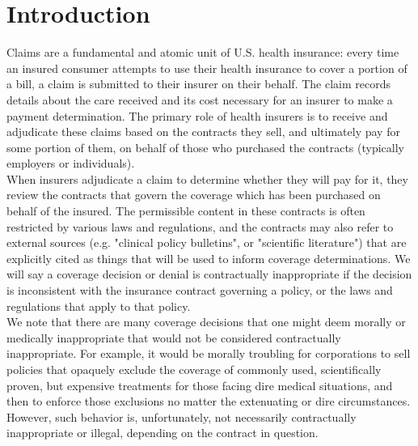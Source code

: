 \documentclass[12pt, a4paper,twoside]{report}
\theoremstyle{plain} %
\theoremstyle{definition} %
\theoremstyle{remark} %
\numberwithin{equation}{chapter}
\begin{document}
		\tableofcontents
		
		
		
		\chapter{Introduction}\label{intro}
		
		\hspace{2em} Claims are a fundamental and atomic unit of U.S. health insurance: every time an insured consumer attempts to use their health insurance to cover a portion of a bill, a claim is submitted to their insurer on their behalf. The claim records details about the care received and its cost necessary for an insurer to make a payment determination. The primary role of health insurers is to receive and adjudicate these claims based on the contracts they sell, and ultimately pay for some portion of them, on behalf of those who purchased the contracts (typically employers or individuals).\\
		
		When insurers adjudicate a claim to determine whether they will pay for it, they review the contracts that govern the coverage which has been purchased on behalf of the insured. The permissible content in these contracts is often restricted by various laws and regulations, and the contracts may also refer to external sources (e.g. "clinical policy bulletins", or "scientific literature") that are explicitly cited as things that will be used to inform coverage determinations. We will say a coverage decision or denial is contractually inappropriate if the decision is inconsistent with the insurance contract governing a policy, or the laws and regulations that apply to that policy.\\
		
		We note that there are many coverage decisions that one might deem morally or medically inappropriate that would not be considered contractually inappropriate. For example, it would be morally troubling for corporations to sell policies that opaquely exclude the coverage of commonly used, scientifically proven, but expensive treatments for those facing dire medical situations, and then to enforce those exclusions no matter the extenuating or dire circumstances. However, such behavior is, unfortunately, not necessarily contractually inappropriate or illegal, depending on the contract in question.\\
		
\end{document}
